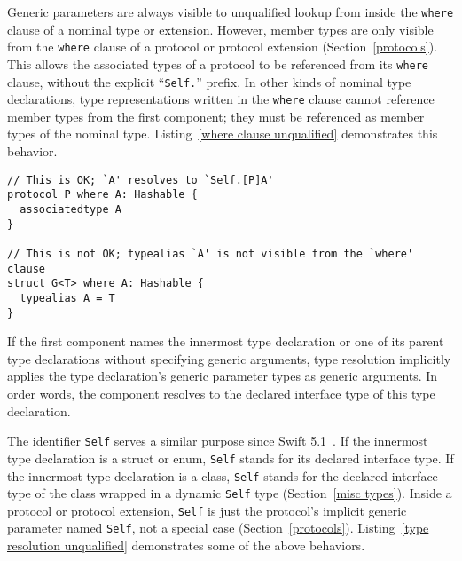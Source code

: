 \documentclass[../generics]{subfiles}
\begin{document}
Generic parameters are always visible to unqualified lookup from inside the \texttt{where} clause of a nominal type or extension. However, member types are only visible from the \texttt{where} clause of a protocol or protocol extension (Section~\ref{protocols}). This allows the associated types of a protocol to be referenced from its \texttt{where} clause, without the explicit ``\texttt{Self.}'' prefix. In other kinds of nominal type declarations, type representations written in the \texttt{where} clause cannot reference member types from the first component; they must be referenced as member types of the nominal type. Listing~\ref{where clause unqualified} demonstrates this behavior.

\begin{listing}\label{where clause unqualified}
\begin{Verbatim}
// This is OK; `A' resolves to `Self.[P]A' 
protocol P where A: Hashable {
  associatedtype A
}

// This is not OK; typealias `A' is not visible from the `where' clause
struct G<T> where A: Hashable {
  typealias A = T
}
\end{Verbatim}
\end{listing}

If the first component names the innermost type declaration or one of its parent type declarations without specifying generic arguments, type resolution implicitly applies the type declaration's generic parameter types as generic arguments. In order words, the component resolves to the declared interface type of this type declaration.

The identifier \texttt{Self} serves a similar purpose since Swift 5.1~\cite{se0068}. If the innermost type declaration is a struct or enum, \texttt{Self} stands for its declared interface type. If the innermost type declaration is a class, \texttt{Self} stands for the declared interface type of the class wrapped in a dynamic \texttt{Self} type (Section~\ref{misc types}). Inside a protocol or protocol extension, \texttt{Self} is just the protocol's implicit generic parameter named \texttt{Self}, not a special case (Section~\ref{protocols}). Listing~\ref{type resolution unqualified} demonstrates some of the above behaviors.
\end{document}
